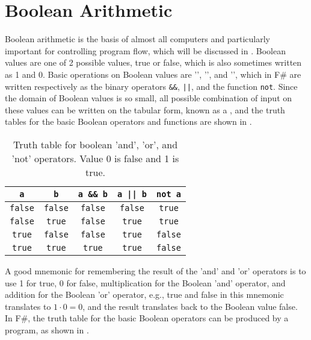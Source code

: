 \documentclass[springer.tex]{subfiles}
\begin{document}
\section{Boolean Arithmetic}
Boolean arithmetic is the basis of almost all computers and particularly important for controlling program flow, which will be discussed in . Boolean values are one of 2 possible values, true or false, which is also sometimes written as 1 and 0. Basic operations on Boolean values are '', '', and '', which in F\# are written respectively as the binary operators \lstinline!&&!, \lstinline!||!, and the function \lstinline!not!. Since the domain of Boolean values is so small, all possible combination of input on these values can be written on the tabular form, known as a , and the truth tables for the basic Boolean operators and functions are shown in .
\begin{table}
  \centering
  \begin{tabular}{|c|c|c|c|c|}
    \hline
     \lstinline!a! & \lstinline!b! & \lstinline!a && b!& \lstinline!a || b! & \lstinline!not a!\\
    \hline
    \lstinline!false!&\lstinline!false!&\lstinline!false!&\lstinline!false!&\lstinline!true!\\
    \lstinline!false!&\lstinline!true!&\lstinline!false!&\lstinline!true!&\lstinline!true!\\
    \lstinline!true!&\lstinline!false!&\lstinline!false!&\lstinline!true!&\lstinline!false!\\
    \lstinline!true!&\lstinline!true!&\lstinline!true!&\lstinline!true!&\lstinline!false!\\
    \hline
  \end{tabular}
  \caption{Truth table for boolean 'and', 'or', and 'not' operators. Value 0 is false and 1 is true.}
  \label{tab:truthTable}
\end{table}
A good mnemonic for remembering the result of the 'and' and 'or' operators is to use 1 for true, 0 for false, multiplication for the Boolean 'and' operator, and addition for the Boolean 'or' operator, e.g., true and false in this mnemonic translates to $1\cdot 0 = 0$, and the result translates back to the Boolean value false. In F\#, the truth table for the basic Boolean operators can be produced by a program, as shown in .
%
%
\end{document}
